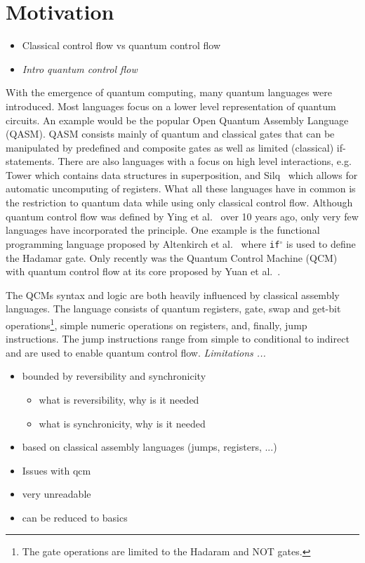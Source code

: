 \chapter{Motivation}
\begin{itemize}
    \item Classical control flow vs quantum control flow~\cite{YYF12}
    \item \emph{Intro quantum control flow}
\end{itemize}
With the emergence of quantum computing, many quantum languages were introduced. Most languages focus on a lower level representation of quantum circuits. An example would be the popular Open Quantum Assembly Language (QASM)\cite{CBSG17}. QASM consists mainly of quantum and classical gates that can be manipulated by predefined and composite gates as well as limited (classical) if-statements. There are also languages with a focus on high level interactions, e.g. Tower\cite{ChMi22} which contains data structures in superposition, and Silq~\cite{BBGV20} which allows for automatic uncomputing of registers. What all these languages have in common is the restriction to quantum data while using only classical control flow. Although quantum control flow was defined by Ying et al.~\cite{YYF12} over 10 years ago, only very few languages have incorporated the principle. One example is the functional programming language proposed by Altenkirch et al.~\cite{AlGr05} where \texttt{if$^\circ$} is used to define the Hadamar gate. Only recently was the Quantum Control Machine (QCM) with quantum control flow at its core proposed by Yuan et al.~\cite{YVC24}. 

The QCMs syntax and logic are both heavily influenced by classical assembly languages. The language consists of quantum registers, gate, swap and get-bit operations\footnote{The gate operations are limited to the Hadaram and NOT gates.}, simple numeric operations on registers, and, finally, jump instructions. The jump instructions range from simple to conditional to indirect and are used to enable quantum control flow. \emph{Limitations ...}
\begin{itemize}
    \item bounded by reversibility and synchronicity
    \begin{itemize}
        \item what is reversibility, why is it needed
        \item what is synchronicity, why is it needed
    \end{itemize}
    \item based on classical assembly languages (jumps, registers, ...)
\end{itemize}

\begin{itemize}
    \item Issues with qcm
    \item very unreadable
    \item can be reduced to basics
\end{itemize}